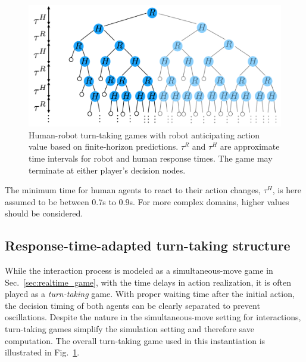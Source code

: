\documentclass[letterpaper, 10 pt, conference]{ieeeconf}  %
\begin{document}
   \begin{figure}[t]
      \centering
      \vspace{-1em}
      \includegraphics[scale=0.2]{turn_taking}
      \vspace{-1.4em}
      \caption{
        Human-robot turn-taking games with robot anticipating action value 
        based on finite-horizon predictions. $\tau^R$ and $\tau^H$ 
  are approximate time intervals for robot and human response times. The game may 
     terminate at either player's decision nodes.}
      \vspace{-1.7em}
     \label{fig:turn_taking}
   \end{figure}
The minimum time for human agents to 
react to their action changes, $\tau^H$,
is here assumed to be between 0.7s to 0.9s. For more complex domains, higher 
values should be considered.
\vspace{-.2em}
\subsection{Response-time-adapted turn-taking structure}
\vspace{-.2em}
While the interaction process is modeled as a simultaneous-move game in 
Sec.~\ref{sec:realtime_game}, with the time delays in action realization, it 
is often played as a \textit{turn-taking} game. With proper waiting time after 
the initial action, the decision timing of both agents can be clearly 
separated to prevent oscillations. Despite the nature in the simultaneous-move 
setting for interactions, turn-taking games simplify the simulation setting 
and therefore save computation. The overall turn-taking game used in this 
instantiation is illustrated in Fig.~\ref{fig:turn_taking}.
\end{document}

